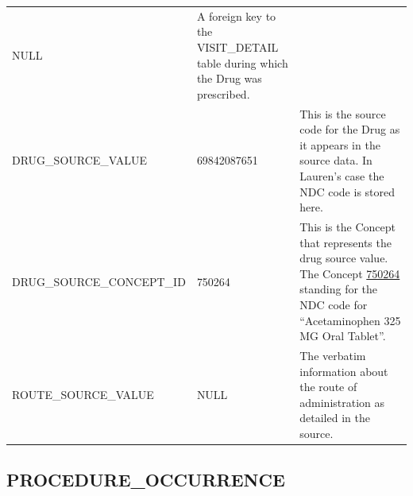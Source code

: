\documentclass[11pt]{book}
\theoremstyle{definition}
\theoremstyle{definition}
\theoremstyle{definition}
\theoremstyle{remark}
\begin{document}
\begin{longtable}[]{@{}lll@{}}
\begin{minipage}[t]{0.15\columnwidth}
NULL\strut
\end{minipage} & \begin{minipage}[t]{0.49\columnwidth}\raggedright
A foreign key to the VISIT\_DETAIL table during which the Drug was prescribed.\strut
\end{minipage}\tabularnewline
\begin{minipage}[t]{0.28\columnwidth}\raggedright
DRUG\_SOURCE\_VALUE\strut
\end{minipage} & \begin{minipage}[t]{0.15\columnwidth}\raggedright
69842087651\strut
\end{minipage} & \begin{minipage}[t]{0.49\columnwidth}\raggedright
This is the source code for the Drug as it appears in the source data. In Lauren's case the NDC code is stored here.\strut
\end{minipage}\tabularnewline
\begin{minipage}[t]{0.28\columnwidth}\raggedright
DRUG\_SOURCE\_CONCEPT\_ID\strut
\end{minipage} & \begin{minipage}[t]{0.15\columnwidth}\raggedright
750264\strut
\end{minipage} & \begin{minipage}[t]{0.49\columnwidth}\raggedright
This is the Concept that represents the drug source value. The Concept \href{http://athena.ohdsi.org/search-terms/terms/750264}{750264} standing for the NDC code for ``Acetaminophen 325 MG Oral Tablet''.\strut
\end{minipage}\tabularnewline
\begin{minipage}[t]{0.28\columnwidth}\raggedright
ROUTE\_SOURCE\_VALUE\strut
\end{minipage} & \begin{minipage}[t]{0.15\columnwidth}\raggedright
NULL\strut
\end{minipage} & \begin{minipage}[t]{0.49\columnwidth}\raggedright
The verbatim information about the route of administration as detailed in the source.\strut
\end{minipage}\tabularnewline
\bottomrule
\end{longtable}

\hypertarget{procedureOccurrence}{%
\subsection{PROCEDURE\_OCCURRENCE}\label{procedureOccurrence}}
\end{document}
